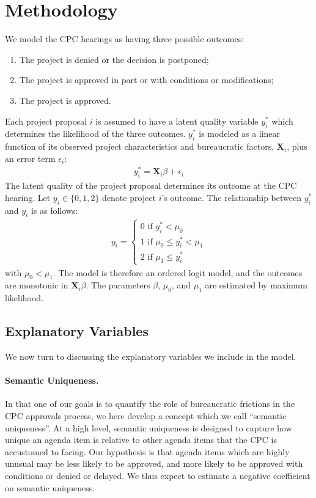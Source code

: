 \section{Methodology}\label{sec_methodology}

We model the CPC hearings as having three possible outcomes:
\begin{enumerate}[start=0]
\item The project is denied or the decision is postponed;
\item The project is approved in part or with conditions or modifications;
\item The project is approved.
\end{enumerate}
Each project proposal $i$ is assumed to have a latent quality variable $y_i^\ast$ which determines the likelihood of the three outcomes. $y_i^\ast$ is modeled as a linear function of its observed project characteristics and bureaucratic factors, $\mathbf{X}_i$, plus an error term $\epsilon_i$:
\begin{align}
y_i^\ast = \mathbf{X}_i \beta + \epsilon_i
\end{align}
The latent quality of the project proposal determines its outcome at the CPC hearing. Let $y_{i} \in \{0, 1, 2\}$ denote project $i$'s outcome. The relationship between $y_i^\ast$ and $y_i$ is as follows:
\begin{align}
y_i = \begin{cases}
0 \text{ if } y_i^\ast < \mu_0 \\
1 \text{ if } \mu_0 \leq y_i^\ast < \mu_1 \\
2 \text{ if } \mu_1 \leq y_i^\ast
\end{cases}
\end{align}
with $\mu_0 < \mu_1$. The model is therefore an ordered logit model, and the outcomes are monotonic in $\mathbf{X}_i \beta$. The parameters $\beta$, $\mu_0$, and $\mu_1$ are estimated by maximum likelihood.

\subsection{Explanatory Variables}

We now turn to discussing the explanatory variables we include in the model.

\paragraph{Semantic Uniqueness.} In that one of our goals is to quantify the role of bureaucratic frictions in the CPC approvals process, we here develop a concept which we call ``semantic uniqueness''. At a high level, semantic uniqueness is designed to capture how unique an agenda item is relative to other agenda items that the CPC is accustomed to facing. Our hypothesis is that agenda items which are highly unusual may be less likely to be approved, and more likely to be approved with conditions or denied or delayed. We thus expect to estimate a negative coefficient on semantic uniqueness.

